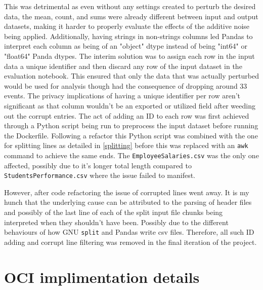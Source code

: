 This was detrimental as even without any settings created to perturb the desired data, the mean, count, and sums were already different between input and output datasets, making it harder to properly evaluate the effects of the additive noise being applied. Additionally, having strings in non-strings columns led Pandas to interpret each column as being of an "object" dtype instead of being "int64" or "float64" Panda dtypes. The interim solution was to assign each row in the input data a unique identifier and then discard any row of the input dataset in the evaluation notebook. This ensured that only the data that was actually perturbed would be used for analysis though had the consequence of dropping around 33 events. The privacy implications of having a unique identifier per row aren't significant as that column wouldn't be an exported or utilized field after weeding out the corrupt entries. The act of adding an ID to each row was first achieved through a Python script being run to preprocess the input dataset before running the Dockerfile. Following a refactor this Python script was combined with the one for splitting lines as detailed in \ref{splitting} before this was replaced with an \texttt{awk} command to achieve the same ends. The \texttt{EmployeeSalaries.csv} was the only one affected, possibly due to it's longer total length compared to \texttt{StudentsPerformance.csv} where the issue failed to manifest.

However, after code refactoring the issue of corrupted lines went away. It is my hunch that the underlying cause can be attributed to the parsing of header files and possibly of the last line of each of the split input file chunks being interpreted when they shouldn't have been. Possibly due to the different behaviours of how GNU \texttt{split} and Pandas write \acrshort{csv} files. Therefore, all such ID adding and corrupt line filtering was removed in the final iteration of the project. 

\section{OCI implimentation details}
